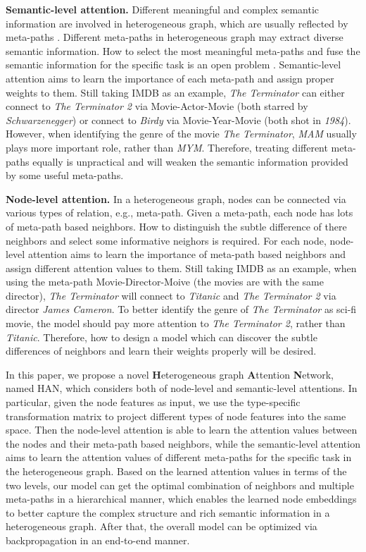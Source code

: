 \textbf{Semantic-level attention.} Different meaningful and complex semantic information are involved in heterogeneous graph, which are usually reflected by meta-paths \cite{sun2011pathsim}. 
Different meta-paths in heterogeneous graph may extract diverse semantic information. How to select the most meaningful meta-paths and fuse the semantic information for the specific task is an open problem \cite{schain,chen2017task,Shang2016MetaPathGE}.
Semantic-level attention aims to learn the importance of each meta-path and assign proper weights to them. Still taking IMDB as an example, \emph{The Terminator} can either connect to  \emph{The Terminator 2} via  Movie-Actor-Movie (both starred by \emph{Schwarzenegger}) or connect to \emph{Birdy} via Movie-Year-Movie (both shot in \emph{1984}). 
However, when identifying the genre of the movie \emph{The Terminator}, \emph{MAM} usually plays more important role, rather than \emph{MYM}.
Therefore, treating different meta-paths equally is unpractical and will weaken the semantic information provided by some useful meta-paths.

\textbf{Node-level attention.}
In a heterogeneous graph, nodes can be connected via various types of relation, e.g., meta-path.
Given a meta-path, each node has lots of meta-path based neighbors. How to distinguish the subtle difference of there neighbors and select some informative neighors is required.
For each node, node-level attention aims to learn the importance of meta-path based neighbors and assign different attention values to them.
Still taking IMDB as an example, 
when using the meta-path Movie-Director-Moive (the movies are with the same director), \emph{The Terminator}  will connect to \emph{Titanic} and \emph{The Terminator 2}  via director \emph{James Cameron}.
To better identify the genre of \emph{The Terminator} as sci-fi movie, the model should pay more attention to \emph{The Terminator 2}, rather than \emph{Titanic}. Therefore, how to design a model which can discover the subtle differences of neighbors and learn their weights properly will be desired.






In this paper, 
we propose a novel 
\textbf{H}eterogeneous graph \textbf{A}ttention \textbf{N}etwork, named HAN, which considers both of node-level and semantic-level attentions.
In particular, given the node features as input, we use the type-specific transformation matrix to project different types of node features into the same space.
Then the node-level attention is able to learn the attention values between the nodes and their meta-path based neighbors, while the semantic-level attention aims to learn the attention values of different meta-paths for the specific task in the heterogeneous graph. Based on the learned attention values in terms of the two levels, our model can get the optimal combination of neighbors and multiple meta-paths in a hierarchical manner, which enables the learned node embeddings to better capture the complex structure and rich semantic information  in a heterogeneous graph.
After that, 
the overall model can be optimized via backpropagation in an end-to-end manner.


